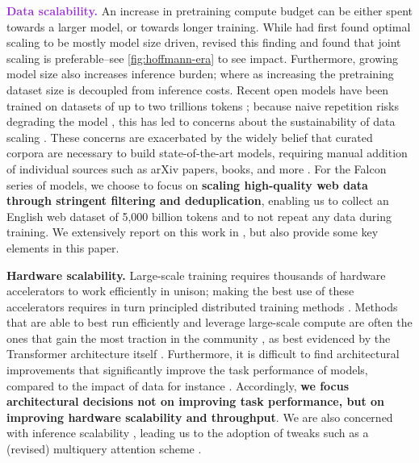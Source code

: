 \documentclass{article}
\DeclareRobustCommand{\data}[1]{\textcolor{DarkOrchid}{#1}}
\DeclareRobustCommand{\hardware}[1]{\textcolor{Mahogany}{#1}}
\begin{document}
\textbf{\data{Data scalability.}} An increase in pretraining compute budget can be either spent towards a larger model, or towards longer training. While \citet{kaplan2020scaling} had first found optimal scaling to be mostly model size driven, \citet{hoffmann2022training} revised this finding and found that joint scaling is preferable--see \cref{fig:hoffmann-era} to see impact. Furthermore, growing model size also increases inference burden; where as increasing the pretraining dataset size is decoupled from inference costs. Recent open models have been trained on datasets of up to two trillions tokens \citep{llama2}; because naive repetition risks degrading the model \citep{hernandez2022scaling, data_constrained}, this has led to concerns about the sustainability of data scaling \citep{villalobos2022will}. These concerns are exacerbated by the widely belief that curated corpora are necessary to build state-of-the-art models, requiring manual addition of individual sources such as arXiv papers, books, and more \citep{brown2020gpt3, gao2020pile}. For the Falcon series of models, we choose to focus on \textbf{scaling high-quality web data through stringent filtering and deduplication}, enabling us to collect an English web dataset of 5,000 billion tokens and to not repeat any data during training. We extensively report on this work in \citet{refinedweb}, but also provide some key elements in this paper.

\textbf{\hardware{Hardware scalability.}} Large-scale training requires thousands of hardware accelerators to work efficiently in unison; making the best use of these accelerators requires in turn principled distributed training methods \citep{megatron-1}. Methods that are able to best run efficiently and leverage large-scale compute are often the ones that gain the most traction in the community \citep{hooker2021hardware}, as best evidenced by the Transformer architecture itself \citep{vaswani2017attention}. Furthermore, it is difficult to find architectural improvements that significantly improve the task performance of models, compared to the impact of data for instance \citep{le2022language}. Accordingly, \textbf{we focus architectural decisions not on improving task performance, but on improving hardware scalability and throughput}. We are also concerned with inference scalability \citep{pope2023efficiently}, leading us to the adoption of tweaks such as a (revised) multiquery attention scheme \citep{multiquery}. 
\end{document}
